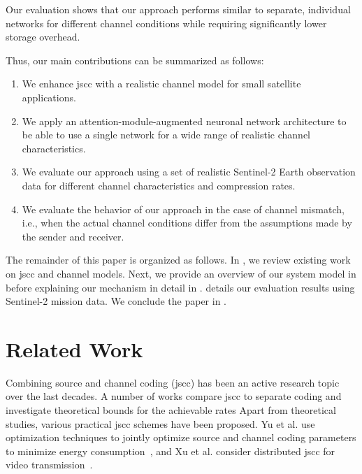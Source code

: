 \documentclass[conference]{IEEEtran}
\newcommand\sentinelii{Sentinel-2\xspace}
\begin{document}
Our evaluation shows that our approach performs similar to separate, individual networks for different channel conditions while requiring significantly lower storage overhead.

Thus, our main contributions can be summarized as follows:
%
\begin{enumerate}
  \item We enhance \ac{jscc} with a realistic channel model for small satellite applications.
  \item We apply an attention-module-augmented neuronal network architecture to be able to use a single network for a wide range of realistic channel characteristics.
  \item We evaluate our approach using a set of realistic \sentinelii Earth observation data for different channel characteristics and compression rates.
  \item We evaluate the behavior of our approach in the case of channel mismatch, i.e., when the actual channel conditions differ from the assumptions made by the sender and receiver.
\end{enumerate}

The remainder of this paper is organized as follows.
In , we review existing work on \ac{jscc} and channel models.
Next, we provide an overview of our system model in  before explaining our mechanism in detail in .
 details our evaluation results using \sentinelii mission data.
We conclude the paper in .

\section{Related Work}
\label{sec:related_work}

Combining source and channel coding (\acs{jscc}) has been an active research topic over the last decades.
A number of works compare \ac{jscc} to separate coding and investigate theoretical bounds for the achievable rates \cite{gallager1968information,1614076,4557472}
Apart from theoretical studies, various practical \ac{jscc} schemes have been proposed.
Yu et al. use optimization techniques to jointly optimize source and channel coding parameters to minimize energy consumption~\cite{Wei2004}, and
Xu et al. consider distributed \ac{jscc} for video transmission~\cite{4205066}. 
\end{document}
